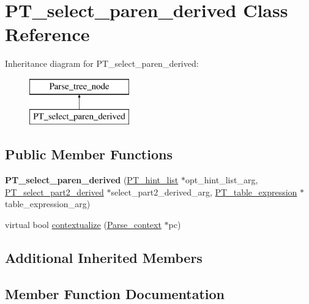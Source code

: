 \hypertarget{classPT__select__paren__derived}{}\section{P\+T\+\_\+select\+\_\+paren\+\_\+derived Class Reference}
\label{classPT__select__paren__derived}
Inheritance diagram for P\+T\+\_\+select\+\_\+paren\+\_\+derived\+:\begin{figure}[H]
\begin{center}
\leavevmode
\includegraphics[height=2.000000cm]{classPT__select__paren__derived}
\end{center}
\end{figure}
\subsection*{Public Member Functions}
\begin{DoxyCompactItemize}
\item 
\mbox{\label{classPT__select__paren__derived_a1fafac1fe4c599ce114b0d984dd9ee95}} 
{\bfseries P\+T\+\_\+select\+\_\+paren\+\_\+derived} (\mbox{\hyperlink{classPT__hint__list}{P\+T\+\_\+hint\+\_\+list}} $\ast$opt\+\_\+hint\+\_\+list\+\_\+arg, \mbox{\hyperlink{classPT__select__part2__derived}{P\+T\+\_\+select\+\_\+part2\+\_\+derived}} $\ast$select\+\_\+part2\+\_\+derived\+\_\+arg, \mbox{\hyperlink{classPT__table__expression}{P\+T\+\_\+table\+\_\+expression}} $\ast$table\+\_\+expression\+\_\+arg)
\item 
virtual bool \mbox{\hyperlink{classPT__select__paren__derived_abe1c66aeacebad14e67fd76613fff79d}{contextualize}} (\mbox{\hyperlink{structParse__context}{Parse\+\_\+context}} $\ast$pc)
\end{DoxyCompactItemize}
\subsection*{Additional Inherited Members}


\subsection{Member Function Documentation}
\mbox{\label{classPT__select__paren__derived_abe1c66aeacebad14e67fd76613fff79d}} 

